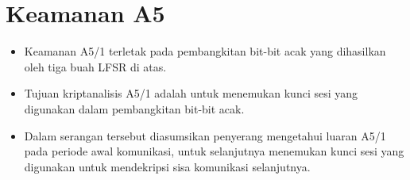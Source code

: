 \documentclass{article}
\begin{document}

\section*{Keamanan A5}

\begin{itemize}
    \item Keamanan A5/1 terletak pada pembangkitan bit-bit acak yang dihasilkan oleh tiga buah LFSR di atas.
    \item Tujuan kriptanalisis A5/1 adalah untuk menemukan kunci sesi yang digunakan dalam pembangkitan bit-bit acak.
    \item Dalam serangan tersebut diasumsikan penyerang mengetahui luaran A5/1 pada periode awal komunikasi, untuk selanjutnya menemukan kunci sesi yang digunakan untuk mendekripsi sisa komunikasi selanjutnya.
\end{itemize}
\end{document}
